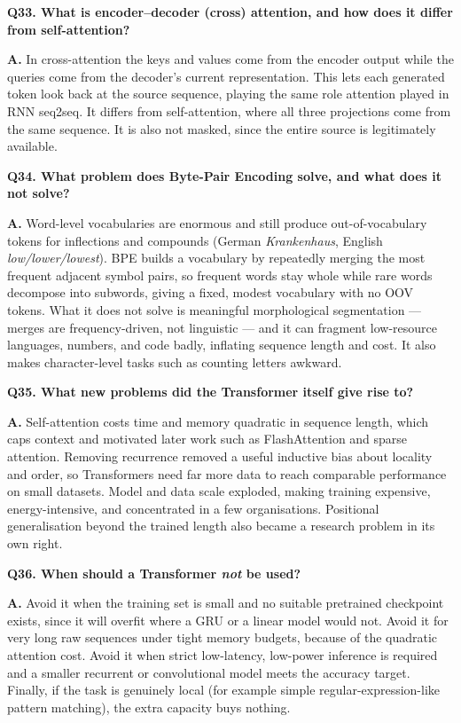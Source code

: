 \documentclass[11pt]{article}
\begin{document}
\medskip
\noindent\textbf{Q33. What is encoder--decoder (cross) attention, and how does it differ from self-attention?}

\noindent\textbf{A.} In cross-attention the keys and values come from the encoder output while the queries come from the decoder's current representation. This lets each generated token look back at the source sequence, playing the same role attention played in RNN seq2seq. It differs from self-attention, where all three projections come from the same sequence. It is also not masked, since the entire source is legitimately available.

\medskip
\noindent\textbf{Q34. What problem does Byte-Pair Encoding solve, and what does it not solve?}

\noindent\textbf{A.} Word-level vocabularies are enormous and still produce out-of-vocabulary tokens for inflections and compounds (German \emph{Krankenhaus}, English \emph{low/lower/lowest}). BPE builds a vocabulary by repeatedly merging the most frequent adjacent symbol pairs, so frequent words stay whole while rare words decompose into subwords, giving a fixed, modest vocabulary with no OOV tokens. What it does not solve is meaningful morphological segmentation --- merges are frequency-driven, not linguistic --- and it can fragment low-resource languages, numbers, and code badly, inflating sequence length and cost. It also makes character-level tasks such as counting letters awkward.

\medskip
\noindent\textbf{Q35. What new problems did the Transformer itself give rise to?}

\noindent\textbf{A.} Self-attention costs time and memory quadratic in sequence length, which caps context and motivated later work such as FlashAttention and sparse attention. Removing recurrence removed a useful inductive bias about locality and order, so Transformers need far more data to reach comparable performance on small datasets. Model and data scale exploded, making training expensive, energy-intensive, and concentrated in a few organisations. Positional generalisation beyond the trained length also became a research problem in its own right.

\medskip
\noindent\textbf{Q36. When should a Transformer \emph{not} be used?}

\noindent\textbf{A.} Avoid it when the training set is small and no suitable pretrained checkpoint exists, since it will overfit where a GRU or a linear model would not. Avoid it for very long raw sequences under tight memory budgets, because of the quadratic attention cost. Avoid it when strict low-latency, low-power inference is required and a smaller recurrent or convolutional model meets the accuracy target. Finally, if the task is genuinely local (for example simple regular-expression-like pattern matching), the extra capacity buys nothing.
\end{document}
